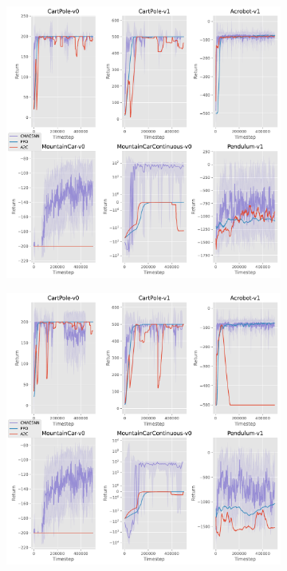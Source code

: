 \documentclass[12pt,a4paper]{article}
\begin{document}
\begin{figure}[ht!]
  \centering
  \begin{subfigure}[ht!]{0.35\textwidth}
    \includegraphics[width=\textwidth]{../plotting/plots/plot_all0.pdf}
    \caption{}
  \end{subfigure}
  \hspace{0.05\textwidth}
  \begin{subfigure}[ht!]{0.35\textwidth}
    \includegraphics[width=\textwidth]{../plotting/plots/plot_all1.pdf}
    \caption{}
  \end{subfigure}


\end{figure}
\end{document}
